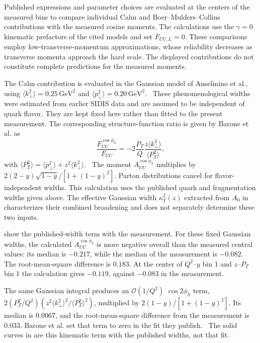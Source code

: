 Published expressions and parameter choices are evaluated at the centers of the measured bins to compare individual Cahn and Boer--Mulders--Collins contributions with the measured cosine moments. The calculations use the $\gamma=0$ kinematic prefactors of the cited models and set $F_{UU,L}=0$. These comparisons employ low-transverse-momentum approximations, whose reliability decreases as transverse momenta approach the hard scale. The displayed contributions do not constitute complete predictions for the measured moments.

The Cahn contribution is evaluated in the Gaussian model of Anselmino et al., using $\langle k_{\perp}^{2}\rangle = 0.25\,\mathrm{GeV}^{2}$ and $\langle p_{\perp}^{2}\rangle = 0.20\,\mathrm{GeV}^{2}$.~\cite{Anselmino:2005nn} These phenomenological widths were estimated from earlier SIDIS data and are assumed to be independent of quark flavor. They are kept fixed here rather than fitted to the present measurement. The corresponding structure-function ratio is given by Barone et al. as
\begin{equation}
    \frac{F_{UU}^{\cos\phi_h}}{F_{UU}} = -2\frac{P_T}{Q}\frac{z\langle k_{\perp}^{2}\rangle}{\langle P_T^{2}\rangle},
    \label{eq:CahnGaussianRatio}
\end{equation}
with $\langle P_T^{2}\rangle = \langle p_{\perp}^{2}\rangle + z^{2}\langle k_{\perp}^{2}\rangle$.~\cite{Barone:2015cgh} The moment $A_{UU}^{\cos\phi_h}$ multiplies  by $2(2-y)\sqrt{1-y}/[1+(1-y)^{2}]$. Parton distributions cancel for flavor-independent widths. This calculation uses the published quark and fragmentation widths given above. The effective Gaussian width $\kappa_T^{2}(z)$ extracted from $A_0$ in  characterizes their combined broadening and does not separately determine these two inputs.

 show the published-width term with the measurement. For these fixed Gaussian widths, the calculated $A_{UU}^{\cos\phi_h}$ is more negative overall than the measured central values: its median is $-0.217$, while the median of the measurement is $-0.082$. The root-mean-square difference is $0.183$. At the center of $Q^{2}$--$y$ bin 1 and $z$--$P_T$ bin 1 the calculation gives $-0.119$, against $-0.083$ in the measurement.

The same Gaussian integral produces an $\mathcal{O}(1/Q^{2})$ $\cos 2\phi_h$ term, $2(P_T^{2}/Q^{2})(z^{2}\langle k_{\perp}^{2}\rangle^{2}/\langle P_T^{2}\rangle^{2})$, multiplied by $2(1-y)/[1+(1-y)^{2}]$. Its median is $0.0067$, and the root-mean-square difference from the measurement is $0.033$. Barone et al. set that term to zero in the fit they publish.~\cite{Barone:2015cgh} The solid curves in  are this kinematic term with the published widths, not that fit.

